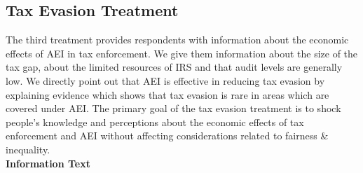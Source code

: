 \documentclass[12pt]{article}
\begin{document}
\subsection*{Tax Evasion Treatment}
The third treatment provides respondents with information about the economic effects of AEI in tax enforcement. We give them information about the size of the tax gap, about the limited resources of IRS and that audit levels are generally low. We directly point out that AEI is effective in reducing tax evasion by explaining evidence which shows that tax evasion is rare in areas which are covered under AEI. The primary goal of the tax evasion treatment is to shock people’s knowledge and perceptions about the economic effects of tax enforcement and AEI without affecting considerations related to fairness \& inequality. \\[0.5em]
\textbf{Information Text}
\end{document}
